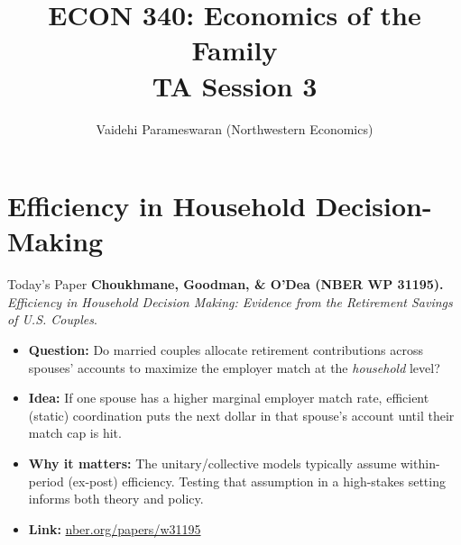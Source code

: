 \documentclass[11pt,notes=hide,aspectratio=169,mathserif]{beamer}
\title[class]{ECON 340: Economics of the Family \\ TA Session 3}
\author[Vaidehi's class]{Vaidehi Parameswaran (Northwestern Economics)}
\date{\monthname[\the\month] \the\year}
\begin{document}
\begin{frame}[plain]
\titlepage
\end{frame}

\section{Efficiency in Household Decision-Making}

\begin{frame}{Today's Paper}
\textbf{Choukhmane, Goodman, \& O'Dea (NBER WP 31195).} \\
\emph{Efficiency in Household Decision Making: Evidence from the Retirement Savings of U.S. Couples}.\\[0.6em]
\small
\begin{itemize}
  \item \textbf{Question:} Do married couples allocate retirement contributions across spouses' accounts to maximize the employer match at the \emph{household} level?
  \item \textbf{Idea:} If one spouse has a higher marginal employer match rate, efficient (static) coordination puts the next dollar in that spouse's account until their match cap is hit.
  \item \textbf{Why it matters:} The unitary/collective models typically assume within-period (ex-post) efficiency. Testing that assumption in a high-stakes setting informs both theory and policy.
  \item \textbf{Link:} \href{https://www.nber.org/papers/w31195}{nber.org/papers/w31195}
\end{itemize}
\end{frame}
\end{document}
